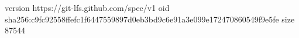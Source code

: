 version https://git-lfs.github.com/spec/v1
oid sha256:c9fc92558ffefc1f6447559897d0eb3bd9c6e91a3e099e172470860549f9e5fe
size 87544

